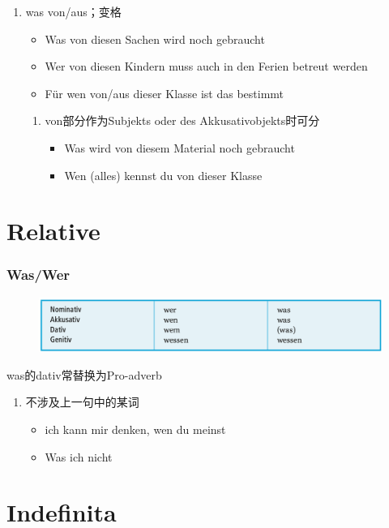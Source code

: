 \documentclass[UTF8]{report}
\begin{document}
\begin{enumerate}
\begin{itemize}
    \end{itemize}
    \item was von/aus；变格
    \begin{itemize}
        \item Was von diesen Sachen wird noch gebraucht
        \item Wer von diesen Kindern muss auch in den Ferien betreut werden
        \item Für wen von/aus dieser Klasse ist das bestimmt
    \end{itemize}
    \begin{enumerate}
        \item von部分作为Subjekts oder des Akkusativobjekts时可分
        \begin{itemize}
            \item Was wird von diesem Material noch gebraucht
            \item Wen (alles) kennst du von dieser Klasse
        \end{itemize}
    \end{enumerate}
\end{enumerate}

\section{Relative}
\subsubsection{Was/Wer}
\begin{figure}[H]
    \centering
    \includegraphics[scale=0.5]{wer.png}
\end{figure}
was的dativ常替换为Pro-adverb
\begin{enumerate}
    \item 不涉及上一句中的某词
    \begin{itemize}
        \item ich kann mir denken, wen du meinst
        \item Was ich nicht 
    \end{itemize}
\end{enumerate}


\section{Indefinita}
\end{document}
